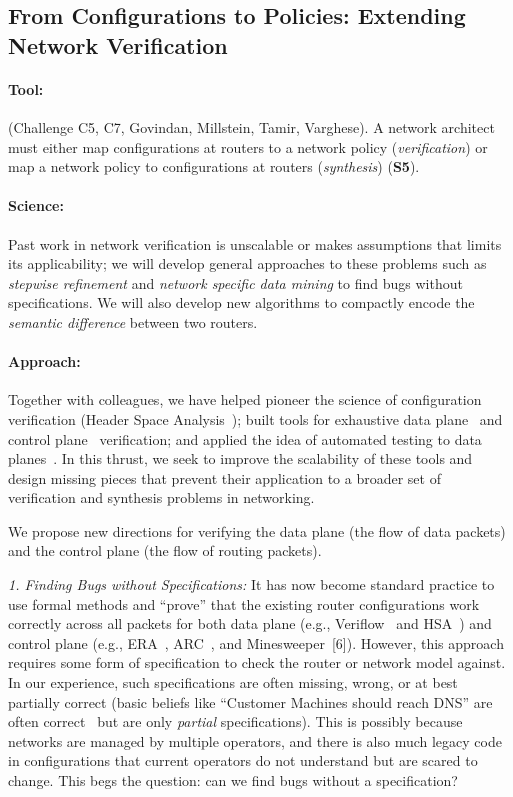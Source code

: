 
\subsection{From Configurations to Policies: Extending Network Verification}

\paragraph*{Tool:} (Challenge C5, C7, Govindan, Millstein, Tamir, Varghese). A network architect must either map configurations at routers to a network policy ({\em verification}) or map a network policy to configurations at routers ({\em synthesis}) ({\bf S5}).

\paragraph*{Science:} Past work in network verification is unscalable or makes assumptions that limits its applicability; we will develop general approaches to these problems such as {\em stepwise refinement} and {\em network specific
data mining} to find bugs without specifications. We will also develop new algorithms to compactly encode the
{\em semantic difference} between two routers.

\paragraph*{Approach:}

Together with colleagues, we have helped pioneer the science of configuration verification (Header Space Analysis~\cite{hsa}); built tools for exhaustive data plane~\cite{hsa,netplumber,nod} and control plane~\cite{batfish,era} verification; and applied the idea of automated testing to data planes~\cite{atpg}.  In this thrust, we seek to improve the scalability of these tools and design missing pieces that prevent their application to a broader set of verification and synthesis problems in networking.

We propose new directions for verifying the data plane (the flow of data packets) and the control plane (the flow of routing packets).

{\em 1. Finding Bugs without Specifications:} It has now become standard practice to use formal methods and ``prove'' that the existing router configurations work correctly across all packets for both data plane (e.g., Veriflow~\cite{veriflow} and HSA~\cite{hsa}) and control plane (e.g., ERA~\cite{era}, ARC~\cite{arc}, and Minesweeper~[6]).  However, this approach requires some form of specification to check the router or network model against.  In our experience, such specifications are often missing, wrong, or at best partially correct (basic beliefs
like ``Customer Machines should reach DNS'' are often correct~\cite{nod} but are only {\em partial} specifications). This is possibly because networks are managed by multiple operators, and there is also much legacy code in configurations that current operators do not understand but are scared to change.  This begs the question: can we find bugs without a specification?

